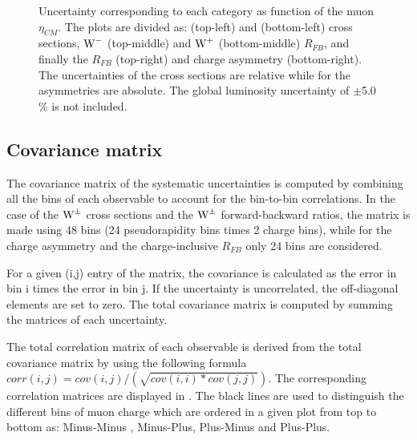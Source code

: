 \begin{figure}[!h]
\begin{center}
 \end{center}
 \caption{Uncertainty corresponding to each category as function of the muon $\eta_{CM}$. The plots are divided as: \WToMuNuMi (top-left) and \WToMuNuPl (bottom-left) cross sections, $\text{W}^{-}$ (top-middle) and $\text{W}^{+}$ (bottom-middle) $R_{FB}$, and finally the \W $R_{FB}$ (top-right) and \W charge asymmetry (bottom-right). The uncertainties of the cross sections are relative while for the asymmetries are absolute. The global luminosity uncertainty of $\pm$5.0$\%$ is not included.}
 \label{fig:Summary_Systematics}
\end{figure}

\subsection{Covariance matrix}\label{sec:WBoson_Systematics_CovarianceMatrix}

The covariance matrix of the systematic uncertainties is computed by combining all the bins of each observable to account for the bin-to-bin correlations. In the case of the $\text{W}^{\pm}$ cross sections and the $\text{W}^{\pm}$ forward-backward ratios, the matrix is made using 48 bins (24 pseudorapidity bins times 2 charge bins), while for the charge asymmetry and the charge-inclusive $R_{FB}$ only 24 bins are considered.

For a given (i,j) entry of the matrix, the covariance is calculated as the error in bin i times the error in bin j. If the uncertainty is uncorrelated, the off-diagonal elements are set to zero. The total covariance matrix is computed by summing the matrices of each uncertainty.

The total correlation matrix of each observable is derived from the total covariance matrix by using the following formula $corr(i,j) = cov(i,j)/(\sqrt{cov(i,i)*cov(j,j)})$. The corresponding correlation matrices are displayed in . The black lines are used to distinguish the different bins of muon charge which are ordered in a given plot from top to bottom as: Minus-Minus , Minus-Plus, Plus-Minus and Plus-Plus.


